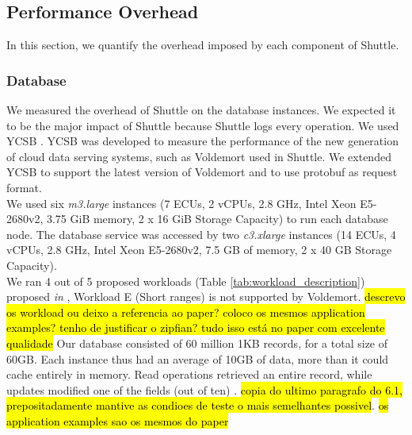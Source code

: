 \subsection{Performance Overhead}\label{sec:eval:performance}
In this section, we quantify the overhead imposed by each component of Shuttle.

\subsubsection{Database}\label{sec:eval:performance:database}
We measured the overhead of Shuttle on the database instances. We expected it to be the major impact of Shuttle because Shuttle logs every operation. We used \acf{YCSB} \cite{ycsb}. \ac{YCSB} was developed to measure the performance of the new generation of cloud data serving systems, such as Voldemort used in Shuttle. We extended \ac{YCSB} to support the latest version of Voldemort and to use \acf{protobuf} as request format.\\

We used six \textit{m3.large} instances (7 \ac{ECU}s, 2 vCPUs, 2.8 GHz, Intel Xeon E5-2680v2, 3.75 GiB memory, 2 x 16 GiB Storage Capacity) to run each database node. The database service was accessed by two \textit{c3.xlarge} instances (14 \ac{ECU}s, 4 vCPUs, 2.8 GHz, Intel Xeon E5-2680v2, 7.5 GB of memory, 2 x 40 GB Storage Capacity).\\


We ran 4 out of 5 proposed workloads (Table \ref{tab:workload_description}) proposed \emph{in} \cite{ycsb}, Workload E (Short ranges) is not supported by Voldemort. \hl{descrevo os workload ou deixo a referencia ao paper? coloco os mesmos application examples? tenho de justificar o zipfian? tudo isso está no paper com excelente qualidade} Our database consisted of 60 million 1KB records, for a total size of 60GB. Each instance thus had an average of 10GB of data, more than it could cache entirely in memory. Read operations retrieved an entire record, while updates modified one of the fields (out of ten) \cite{ycsb}. \hl{copia do ultimo paragrafo do 6.1, prepositadamente mantive as condioes de teste o mais semelhantes possivel}.  \hl{os application examples sao os mesmos do paper}

